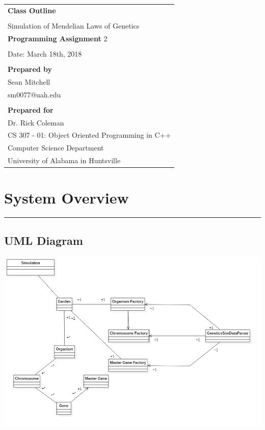 \documentclass{article}
\begin{document}
\begin{center}
\begin{tabular}{l}

\textbf{Class Outline}\\
\\
Simulation of Mendelian Laws of Genetics\\
\textbf{Programming Assignment} 2\\
\\

Date: March 18th, 2018\\
\\
\textbf{Prepared by}\\
Sean Mitchell\\
sm0077@uah.edu\\
\\

\textbf{Prepared for}\\
Dr. Rick Coleman\\
CS 307 - 01: Object Oriented Programming in C++\\
Computer Science Department\\
University of Alabama in Huntsville\\

\end{tabular}
\end{center}

\newpage
\setcounter{tocdepth}{4}
\setcounter{secnumdepth}{4}
\tableofcontents
\newpage

\section{System Overview}
\hrule
\subsection{UML Diagram}
\begin{center}
\begin{minipage}{\textwidth}
\includegraphics[width=1\linewidth]{main.png}
\end{minipage}
\end{center}
\end{document}
